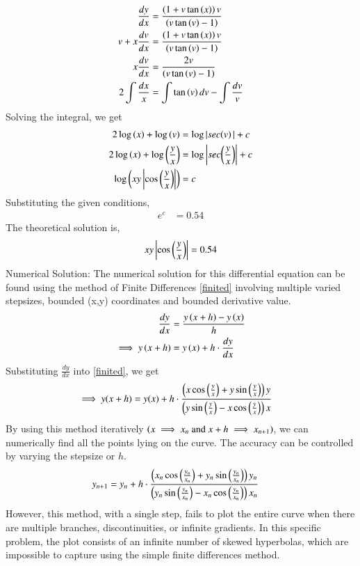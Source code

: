 \documentclass[journal]{IEEEtran}
\begin{document}
	\begin{align}
		\frac{dy}{dx} &= \frac{ \left(1 + v \tan\left(x\right) \right)v}{\left(v \tan\left(v\right) - 1 \right)}\\
		v + x\frac{dv}{dx} &= \frac{ \left(1 + v \tan\left(x\right) \right)v}{\left(v \tan\left(v\right) - 1 \right)}\\
		x\frac{dv}{dx} &= \frac{ 2v}{\left(v \tan\left(v\right) - 1 \right)}\\
		2\int\frac{dx}{x} &=  \int\tan\left(v\right)dv - \int\frac{dv}{v}
	\end{align}
	Solving the integral, we get
	\begin{align}
		2\log\left(x\right) + \log{\ensuremath{\left(v\right)}} &= \log|sec{\left(v\right)|} + c \\
		2\log\left(x\right) + \log{\ensuremath{\left(\frac{y}{x}\right)}} &= \log\left\vert sec{\left(\frac{y}{x}\right)}\right\vert + c \\
		\log{\ensuremath{\left(xy\left\vert\cos\left(\frac{y}{x}\right)\right\vert\right)}} &= c\\
	\end{align}
	Substituting the given conditions,
	\begin{align}
		e^c &= 0.54
	\end{align}
	The theoretical solution is,
	\begin{align}
		xy\left\vert\cos\left(\frac{y}{x}\right)\right\vert &= 0.54\\
	\end{align}
	\newline
	Numerical Solution:\newline
	The numerical solution for this differential equation can be found using the method of Finite Differences \eqref{finited} involving multiple varied stepsizes, bounded (x,y) coordinates and bounded derivative value.
	\begin{align}
		\frac{dy}{dx} &= \frac{y\left(x+h\right) - y\left(x\right)}{h} \\
		\implies y\left(x+h\right) &= y\left(x\right) + h\cdot\frac{dy}{dx} \label{finited}
	\end{align}
	Substituting $\frac{dy}{dx}$ into \eqref{finited}, we get
	\begin{align}
		\implies y(x+h) &= y(x) + h\cdot\frac{ \left(x \cos\left(\frac{y}{x}\right) + y \sin\left(\frac{y}{x}\right) \right)y}{\left(y \sin\left(\frac{y}{x}\right) - x \cos\left(\frac{y}{x}\right) \right)x} 
	\end{align}
	By using this method iteratively $\left(x \implies x_n \text{ and } x+h \implies x_{n+1}\right)$, we can numerically find all the points lying on the curve. The accuracy can be controlled by varying the stepsize or $h$.
	\begin{align}
		y_{n+1} &= y_n + h\cdot\frac{ \left(x_n \cos\left(\frac{y_n}{x_n}\right) + y_n \sin\left(\frac{y_n}{x_n}\right) \right)y_n}{\left(y_n \sin\left(\frac{y_n}{x_n}\right) - x_n \cos\left(\frac{y_n}{x_n}\right) \right)x_n} 
	\end{align}
	However, this method, with a single step, fails to plot the entire curve when there are multiple branches, discontinuities, or infinite gradients. In this specific problem, the plot consists of an infinite number of skewed hyperbolas, which are impossible to capture using the simple finite differences method.  
	
\end{document}
